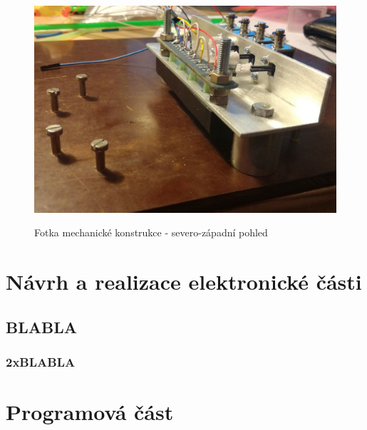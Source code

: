 \documentclass[12pt,oneside]{book} %
\begin{document}
\begin{figure}[h] \large\centering
\includegraphics[width=1.00\textwidth]{./img/konstr1.png}\\[1cm] 
\caption{Fotka mechanické konstrukce - severo-západní pohled}
\label{konstr1}
\end{figure} 
\part{Návrh a realizace elektronické části}\label{elektro}

\chapter{BLABLA}\label{BLABLA}
\section{2xBLABLA}\label{2xBLABLA}

\part{Programová část}\label{program}
\end{document}
